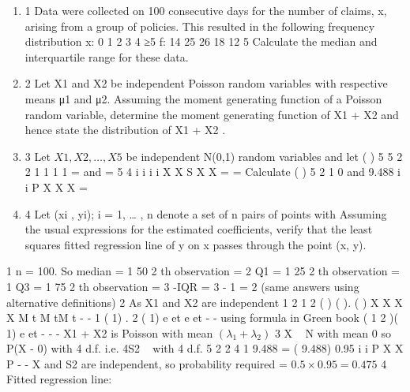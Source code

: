 \documentclass[a4paper,12pt]{article}
\begin{document}
\begin{enumerate}

\item 1 Data were collected on 100 consecutive days for the number of claims, x, arising
from a group of policies. This resulted in the following frequency distribution
x: 0 1 2 3 4 ≥5
f: 14 25 26 18 12 5
Calculate the median and interquartile range for these data. 

\item 2 Let X1 and X2 be independent Poisson random variables with respective means μ1
and μ2.
Assuming the moment generating function of a Poisson random variable,
determine the moment generating function of X1 + X2 and hence state the
distribution of X1 + X2 . 

\item 3 Let $X1 , X2 , \ldots , X5$ be independent N(0,1) random variables and let
( ) 5 5 2 2
1 1
1 1
= and =
5 4 i i
i i
X X S X X
= =
Calculate ( ) 5 2
1
0 and 9.488 i
i
P X X X
=

\item 4 Let {(xi , yi); i = 1, … , n} denote a set of n pairs of points with
Assuming the usual expressions for the estimated coefficients, verify that the
least squares fitted regression line of y on x passes through the point (x, y). 
\end{enumerate}

\newpage

1 n = 100. So median =
1
50
2
th observation = 2
Q1 =
1
25
2
th observation = 1
Q3 =
1
75
2
th observation = 3 -IQR = 3 - 1 = 2
(same answers using alternative definitions)
2 As X1 and X2 are independent
1 2 1 2
( ) ( ). ( ) X X X X M t M tM t -
-
1 ( 1) . 2 ( 1) e et e et -%
- using formula in Green book
( 1 2 )( 1) e et - %
-
- X1 + X2 is Poisson with mean $(\lambda_1 + \lambda_2)$
3 X ~ N with mean 0 so P(X - 0)%
with 4 d.f. i.e. 4S2 ~ %
with 4 d.f.
5 2 2
4
1
9.488 = ( 9.488) 0.95 i
i
P X X P
-
%
-
X and S2 are independent, so probability required = $0.5 \times 0.95 = 0.475$
4 Fitted regression line:
\end{document}
